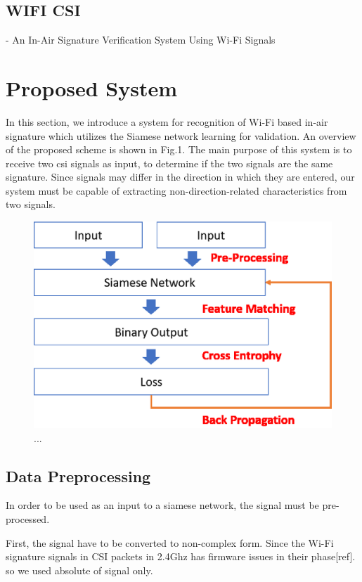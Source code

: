 \documentclass[runningheads]{llncs}
\begin{document}
\subsection{WIFI CSI}
- An In-Air Signature Verification System Using Wi-Fi Signals 

\section{Proposed System}

In this section, we introduce a system for recognition of Wi-Fi based in-air signature which utilizes the Siamese network learning for validation.
An overview of the proposed scheme is shown in Fig.1.
The main purpose of this system is to receive two csi signals as input, to 
determine if the two signals are the same signature.
Since signals may differ in the direction in which they are entered, our system must be capable of extracting non-direction-related characteristics from two signals.
\begin{figure}
\includegraphics[width=\textwidth]{methods1.eps}
\caption{...} \label{method1}
\end{figure}

\subsection{Data Preprocessing}
In order to be used as an input to a siamese network, the signal must be pre-processed.

First, the signal have to be converted to non-complex form.
Since the Wi-Fi signature signals in CSI packets in 2.4Ghz has firmware issues in their phase[ref]. so we used absolute of signal only.
\end{document}
